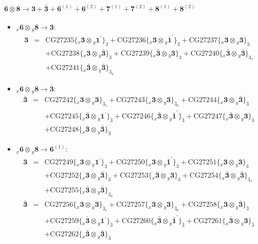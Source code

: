 \documentclass[english]{article}
\newcommand{\rep}[1]{\mathbf{#1}}
\newcommand{\repx}[2]{{}_{#2}\mathbf{#1}}
\newcommand{\subcg}[3]{\big\{ \repx{#1}{x}\otimes\repx{#2}{y}\big\}^{}_{#3}}
\begin{document}
\paragraph*{\Large $\rep{6}\otimes\rep{8}\to\rep{3}+\rep{\bar{3}}+\rep{6}^{(1)}+\rep{6}^{(2)}+\rep{7}^{(1)}+\rep{7}^{(2)}+\rep{8}^{(1)}+\rep{8}^{(2)}$}
\begin{itemize}
\item $\repx{6}{x}\otimes\repx{8}{y}\to\rep{3}$:
\begin{eqnarray*}
\rep{3} &=& \text{CG27235}\subcg{3}{1^{\prime}}{3}+\text{CG27236}\subcg{3}{\bar{1}^{\prime}}{3}+\text{CG27237}\subcg{3}{3}{3} \\ 
 & & +\text{CG27238}\subcg{3}{\bar{3}}{3}+\text{CG27239}\subcg{\bar{3}}{3}{3}+\text{CG27240}\subcg{\bar{3}}{\bar{3}}{3_{s}} \\ 
 & & +\text{CG27241}\subcg{\bar{3}}{\bar{3}}{3_{a}}
\end{eqnarray*}
\item $\repx{6}{x}\otimes\repx{8}{y}\to\rep{\bar{3}}$:
\begin{eqnarray*}
\rep{\bar{3}} &=& \text{CG27242}\subcg{3}{3}{\bar{3}_{s}}+\text{CG27243}\subcg{3}{3}{\bar{3}_{a}}+\text{CG27244}\subcg{3}{\bar{3}}{\bar{3}} \\ 
 & & +\text{CG27245}\subcg{\bar{3}}{1^{\prime}}{\bar{3}}+\text{CG27246}\subcg{\bar{3}}{\bar{1}^{\prime}}{\bar{3}}+\text{CG27247}\subcg{\bar{3}}{3}{\bar{3}} \\ 
 & & +\text{CG27248}\subcg{\bar{3}}{\bar{3}}{\bar{3}}
\end{eqnarray*}
\item $\repx{6}{x}\otimes\repx{8}{y}\to\rep{6}^{(1)}$:
\begin{eqnarray*}
\rep{3} &=& \text{CG27249}\subcg{3}{1^{\prime}}{3}+\text{CG27250}\subcg{3}{\bar{1}^{\prime}}{3}+\text{CG27251}\subcg{3}{3}{3} \\ 
 & & +\text{CG27252}\subcg{3}{\bar{3}}{3}+\text{CG27253}\subcg{\bar{3}}{3}{3}+\text{CG27254}\subcg{\bar{3}}{\bar{3}}{3_{s}} \\ 
 & & +\text{CG27255}\subcg{\bar{3}}{\bar{3}}{3_{a}}
\\
\rep{\bar{3}} &=& \text{CG27256}\subcg{3}{3}{\bar{3}_{s}}+\text{CG27257}\subcg{3}{3}{\bar{3}_{a}}+\text{CG27258}\subcg{3}{\bar{3}}{\bar{3}} \\ 
 & & +\text{CG27259}\subcg{\bar{3}}{1^{\prime}}{\bar{3}}+\text{CG27260}\subcg{\bar{3}}{\bar{1}^{\prime}}{\bar{3}}+\text{CG27261}\subcg{\bar{3}}{3}{\bar{3}} \\ 
 & & +\text{CG27262}\subcg{\bar{3}}{\bar{3}}{\bar{3}}

\end{eqnarray*}
\end{itemize}
\end{document}
